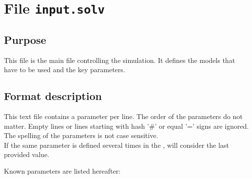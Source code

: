 \section{File \texttt{input.solv}}
\subsection{Purpose}
This file is the main file controlling the simulation. It defines the models that have to be used and the key parameters.

\subsection{Format description}
This text file contains a parameter per line. The order of the parameters do not matter. Empty lines or lines starting with hash '\#' or equal '=' signs are ignored.\\
The spelling of the parameters is not case sensitive.\\
If the same parameter is defined several times in the , \swdd will consider the last provided value.

Known parameters are listed hereafter:


